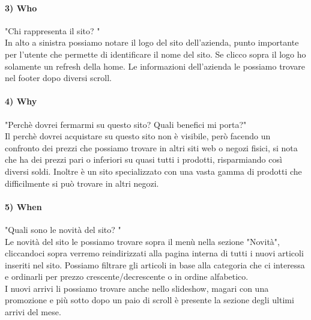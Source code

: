 \documentclass[12pt]{article}
\begin{document}
	\paragraph{3) Who} "Chi rappresenta il sito? "
	\\
	In alto a sinistra possiamo notare il logo del sito dell'azienda, punto importante per l'utente che permette di identificare il nome del sito. Se clicco sopra il logo ho solamente un refresh della home. Le informazioni dell'azienda le possiamo trovare nel footer dopo diversi scroll. 
	\paragraph{4) Why} "Perchè dovrei fermarmi su questo sito? Quali benefici mi porta?"
	\\
	Il perchè dovrei acquistare su questo sito non è visibile, però facendo un confronto dei prezzi che possiamo trovare in altri siti web o negozi fisici, si nota che ha dei prezzi pari o inferiori su quasi tutti i prodotti, risparmiando così diversi soldi. Inoltre è un sito specializzato con una vasta gamma di prodotti che difficilmente si può trovare in altri negozi.
	\newpage
	\paragraph{5) When} "Quali sono le novità del sito? "
	\\
	Le novità del sito le possiamo trovare sopra il menù nella sezione "Novità", cliccandoci sopra verremo reindirizzati alla pagina interna di tutti i nuovi articoli inseriti nel sito. Possiamo filtrare gli articoli in base alla categoria che ci interessa e ordinarli per prezzo crescente/decrescente o in ordine alfabetico. \\
	I nuovi arrivi li possiamo trovare anche nello slideshow, magari con una promozione e più sotto dopo un paio di scroll è presente la sezione degli ultimi arrivi del mese.
\end{document}
